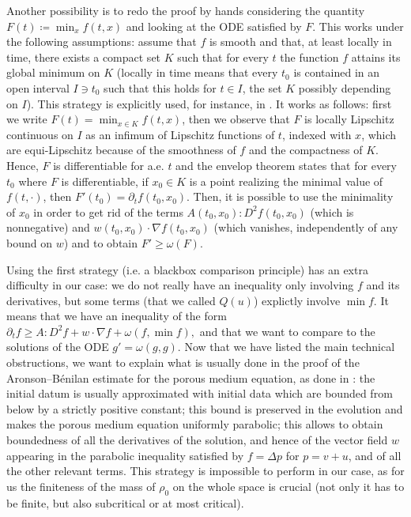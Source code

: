 \documentclass[11pt,a4paper]{article}
\numberwithin{equation}{section}
\theoremstyle{plain}
\theoremstyle{remark}
\begin{document}
Another possibility is to redo the proof by hands considering the quantity $F(t) \coloneqq \min_x f(t,x)$ and looking at the ODE satisfied by $F$. This works under the following assumptions: assume that $f$ is smooth and that, at least locally in time, there exists a compact set $K$ such that for every $t$ the function $f$ attains its global minimum on $K$ (locally in time means that every $t_0$ is contained in an open interval $I\ni t_0$ such that this holds for $t\in I$, the set $K$ possibly depending on $I$). This strategy is explicitly used, for instance, in \cite{David_Santambrogio23}. It works as follows: first we write $F(t)=\min_{x\in K} f(t,x)$, then we observe that $F$ is locally Lipschitz continuous on $I$ as an infimum of Lipschitz functions of $t$, indexed with $x$, which are equi-Lipschitz because of the smoothness of $f$ and the compactness of $K$. Hence, $F$ is differentiable for a.e. $t$ and the envelop theorem states that for every $t_0$ where $F$ is differentiable, if $x_0\in K$ is a point realizing the minimal value of $f(t,\cdot)$, then $F'(t_0)=\partial_t f(t_0,x_0)$. Then, it is possible to use the minimality of $x_0$ in order to get rid of the terms $A(t_0,x_0):D^2f(t_0,x_0)$ (which is nonnegative) and $w(t_0,x_0)\cdot \nabla f(t_0,x_0)$ (which vanishes, independently of any bound on $w$) and to obtain $F'\geq \omega(F)$.

Using the first strategy (i.e. a blackbox comparison principle) has an extra difficulty in our case: we do not really have an inequality only involving $f$ and its derivatives, but some terms (that we called $Q(u)$) explictly involve $\min f$. It means that we have an inequality of the form $\partial_t f\geq A:D^2f+w\cdot \nabla f+\omega(f,\min f),$ and that we want to compare to the solutions of the ODE $g'=\omega(g,g)$.  Now that we have listed the main technical obstructions, we want to explain what is usually done in the proof of the Aronson--B\'enilan estimate for the porous medium equation, as done in \cite{Vazquez06}: the initial datum is usually approximated with initial data which are bounded from below by a strictly positive constant; this bound is preserved in the evolution and makes the porous medium equation uniformly parabolic; this allows to obtain boundedness of all the derivatives of the solution, and hence of the vector field $w$ appearing in the parabolic inequality satisfied by $f=\Delta p$ for $p = v + u$, and of all the other relevant terms. This strategy is impossible to perform in our case, as for us the finiteness of the mass of $\rho_0$ on the whole space is crucial (not only it has to be finite, but also subcritical or at most critical). 
\end{document}
